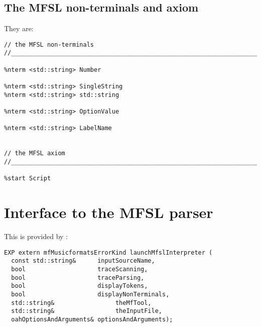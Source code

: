 \subsection{The MFSL non-terminals and axiom}

They are:
\begin{lstlisting}[language=Bison]
// the MFSL non-terminals
//_______________________________________________________________________________

%nterm <std::string> Number

%nterm <std::string> SingleString
%nterm <std::string> std::string

%nterm <std::string> OptionValue

%nterm <std::string> LabelName


// the MFSL axiom
//_______________________________________________________________________________

%start Script
\end{lstlisting}


\section{Interface to the MFSL parser}

This is provided by :
\begin{lstlisting}[language=Terminal]
EXP extern mfMusicformatsErrorKind launchMfslInterpreter (
  const std::string&      inputSourceName,
  bool                    traceScanning,
  bool                    traceParsing,
  bool                    displayTokens,
  bool                    displayNonTerminals,
  std::string&                 theMfTool,
  std::string&                 theInputFile,
  oahOptionsAndArguments& optionsAndArguments);
\end{lstlisting}

